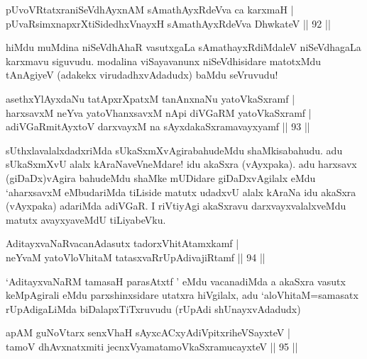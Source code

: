 
\begin{shl}
pUvoVRtatxraniSeVdhAyxnAM sAmathAyxRdeVva ca karxmaH |\\
pUvaRsimxnapxrXtiSidedhxV\s nayxH sAmathAyxRdeVva DhwkateV \hfill || 92 ||
\end{shl}

\begin{artha}
hiMdu muMdina niSeVdhAhaR vasutxgaLa sAmathayxRdiMdaleV niSeVdhagaLa karxmavu siguvudu. modalina viSayavanunx niSeVdhisidare matotxMdu tAnAgiyeV (adakekx virudadhxvAdadudx) baMdu seVruvudu!
\end{artha}%


\begin{shl}
asethxYlAyxdaNu tatApxrXpatxM tanAnxnaNu yatoV\s kaSxramf |\\
harxsavxM neYva yatoV\s hanxsavxM nApi diVGaRM yatoV\s kaSxramf |\\
adiVGaRmitAyxtoV darxvayxM na sAyxdakaSxramavayxyamf \hfill || 93 ||
\end{shl}

\begin{artha}
sUthxlavalalxdadxriMda sUkaSxmXvAgirabahudeMdu shaMkisabahudu. adu sUkaSxmXvU alalx kAraNaveVneMdare! idu akaSxra (vAyxpaka). adu harxsavx (giDaDx)vAgira bahudeMdu shaMke mUDidare giDaDxvAgilalx eMdu `aharxsavxM eMbudariMda tiLiside matutx udadxvU alalx kAraNa idu akaSxra (vAyxpaka) adariMda adiVGaR. I riVtiyAgi akaSxravu darxvayxvalalxveMdu matutx avayxyaveMdU tiLiyabeVku.
\end{artha}

\begin{shl}
AditayxvaNaRvacanAdasutx tadorxVhitAtamxkamf |\\
neYvaM yatoV\s loVhitaM tatasxvaRrUpAdivajiRtamf \hfill || 94 ||
\end{shl}

\begin{artha}
`AditayxvaNaRM tamasaH parasAtxtf ' eMdu vacanadiMda a akaSxra vasutx keMpAgirali eMdu parxshinxsidare utatxra hiVgilalx, adu `aloVhitaM=samasatx rUpAdigaLiMda biDalapxTiTxruvudu (rUpAdi shUnayxvAdadudx)
\end{artha}


\begin{shl}
apAM guNoV\s tarx senxVhaH sAyxcACxyA\s diVpitxriheVSayxteV  |\\
tamoV dhAvxnatxmiti jecnxVyamatamoV\s kaSxramucayxteV \hfill || 95 ||
\end{shl}

